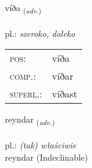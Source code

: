 \documentclass[frontgrid, backgrid]{flacards}\usepackage[]{graphicx}\usepackage[]{xcolor}
\begin{document}
\renewcommand{\flhead}{\vskip5pt \fboxsep=0pt {\small\bfseries\footnotesize Atviksorð | przysłówek}}
\renewcommand{\fcfoot}{\vskip5pt \fboxsep=0pt \hspace{2pt}{\small\bfseries\footnotesize 1K}}

\renewcommand{\blhead}{\vskip5pt {\small\bfseries\footnotesize Atviksorð | przysłówek }}
\renewcommand{\bcfoot}{\vskip5pt \hspace{2pt}{\small\bfseries\footnotesize 1K}}


{víða \small{\textsubscript{(\textit{adv.})}} \\[1ex] %
\textphonetic{[viːða]} \\
pl.: \emph{szeroko, daleko} \\  [2ex]
\renewcommand*{\arraystretch}{0.8}
\begin{tabular}{ll}
\textsc{pos}: & víða \\ 
\textsc{comp.}: & víðar \\ 
\textsc{superl.}: & víðast \\
\end{tabular}
}


\renewcommand{\flhead}{\vskip5pt \fboxsep=0pt {\small\bfseries\footnotesize Atviksorð | przysłówek}}
\renewcommand{\fcfoot}{\vskip5pt \fboxsep=0pt \hspace{2pt}{\small\bfseries\footnotesize 1K}}

\renewcommand{\blhead}{\vskip5pt {\small\bfseries\footnotesize Atviksorð | przysłówek }}
\renewcommand{\bcfoot}{\vskip5pt \hspace{2pt}{\small\bfseries\footnotesize 1K}}


{reyndar \small{\textsubscript{(\textit{adv.})}} \\[1ex]
\textphonetic{[reintar]} \\
pl.: \emph{(tak) właściwie} \\  [2ex]
reyndar (Indeclinable)}

\renewcommand{\flhead}{\vskip5pt \fboxsep=0pt {\small\bfseries\footnotesize Nafnorð | rzeczownik}}
\renewcommand{\fcfoot}{\vskip5pt \fboxsep=0pt \hspace{2pt}{\small\bfseries\footnotesize 1K}}
\end{document}
